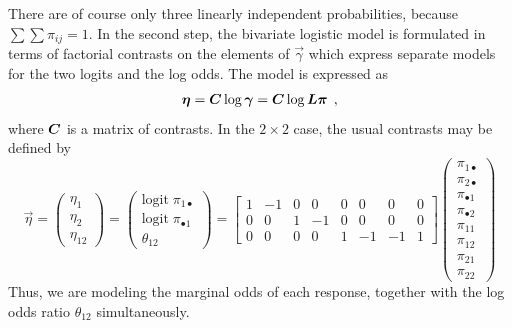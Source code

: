 \documentclass[11pt]{book}\usepackage[]{graphicx}\usepackage[]{color}
\begin{document}
There are of course only three linearly independent probabilities, because
$\sum \sum \pi _{ij}=1$. In the second step,
the bivariate logistic model is formulated in terms
of factorial contrasts on the elements of $\vec{\gamma }$ which express
separate models for the two logits and the log odds. The model is expressed
as
\begin{equation}\label{eq:eta1}
 \bm{\eta }=\bm{C}\log \bm{\gamma} =\bm{C} \log \bm{L} \bm{\pi}
 \:\: ,
\end{equation}
where $\bm{C}$ is a matrix of contrasts. In the $2\times 2$ case, the
usual contrasts may be defined by
\begin{equation}\label{eq:eta2}
\vec{\eta }=\left(
\begin{array}{c}
\eta _1 \\
\eta _2 \\
\eta _{12}
\end{array}
\right) =\left(
\begin{array}{c}
\mathrm{logit}\;\pi _{1\bullet } \\
\mathrm{logit}\;\pi _{\bullet 1} \\
\theta_{12}
\end{array}
\right) =\left[
\begin{array}{rrrrrrrr}
1 & -1 & 0 & 0 & 0 & 0 & 0 & 0 \\
0 &  0 & 1 & -1 & 0 & 0 & 0 & 0 \\
0 &  0 & 0 & 0 & 1 & -1 & -1 & 1
\end{array}
\right] \left(
\begin{array}{c}
\pi _{1\bullet } \\
\pi _{2\bullet } \\
\pi _{\bullet 1} \\
\pi _{\bullet 2} \\
\pi _{11} \\
\pi _{12} \\
\pi _{21} \\
\pi _{22}
\end{array}
\right)
\end{equation}
Thus,
we are modeling the marginal odds of each response, together
with the log odds ratio $\theta_{12}$ simultaneously.
\end{document}
